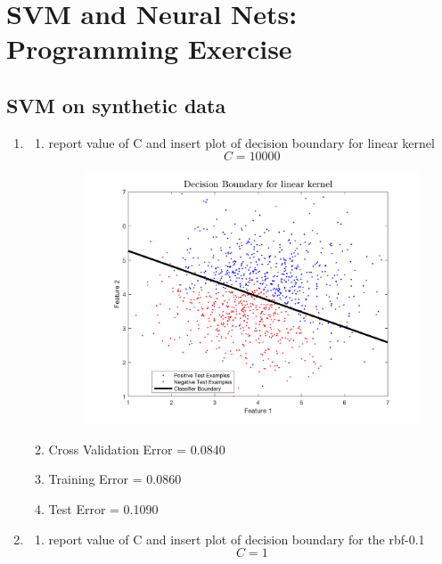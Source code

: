 \documentclass[english]{article}
\begin{document}
\pagebreak
\section{SVM and Neural Nets: Programming Exercise}
\subsection{SVM on synthetic data}
\begin{enumerate}
\item
\begin{enumerate}
\item report value of C and insert plot of decision boundary for linear kernel \newline
$$C = 10000$$

\begin{figure}[H]
\centering
\includegraphics[scale = 0.6]{linear}\newline
\end{figure}

\item Cross Validation Error = 0.0840
\item Training Error = 0.0860
\item Test Error = 0.1090
\end{enumerate}

\pagebreak
\item 
\begin{enumerate}

\item report value of C and insert plot of decision boundary for the rbf-0.1 \newline
$$C = 1$$


\end{enumerate}
\end{enumerate}
\end{document}
